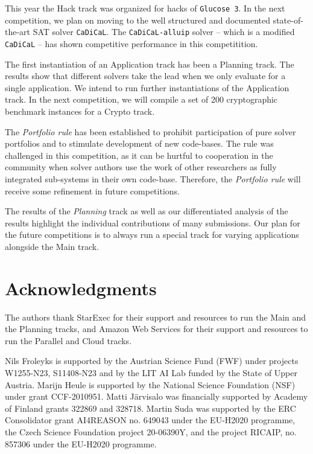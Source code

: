 \documentclass{elsarticle}
\newcommand{\solver}[1]{\texttt{#1}}
\begin{document}
This year the Hack track was organized for hacks of \solver{Glucose 3}. 
In the next competition, we plan on moving to the well structured and documented state-of-the-art SAT solver \solver{CaDiCaL}. 
The \solver{CaDiCaL-alluip} solver -- which is a modified \solver{CaDiCaL} -- has shown competitive performance in this competitition. 

The first instantiation of an Application track has been a Planning track. 
The results show that different solvers take the lead when we only evaluate for a single application. 
We intend to run further instantiations of the Application track. 
In the next competition, we will compile a set of 200 cryptographic benchmark instances for a Crypto track. 

The \emph{Portfolio rule} has been established to prohibit participation of pure solver portfolios and to stimulate development of new code-bases. 
The rule was challenged in this competition, as it can be hurtful to cooperation in the community when solver authors use the work of other researchers as fully integrated sub-systems in their own code-base. 
Therefore, the \emph{Portfolio rule} will receive some refinement in future competitions. 

The results of the \emph{Planning} track as well as our differentiated analysis of the results highlight the individual contributions of many submissions. 
Our plan for the future competitions is to always run a special track for varying applications alongside the Main track. 


\section*{Acknowledgments}
The authors thank StarExec for their support and resources to run the Main and the Planning tracks, and Amazon Web Services 
for their support and resources to run the Parallel and Cloud tracks. 

Nils Froleyks is supported by the Austrian Science Fund (FWF) under projects
W1255-N23, S11408-N23 and by the LIT AI Lab funded by the State of Upper
Austria.
%
Marijn Heule is supported by the National Science Foundation (NSF) under grant CCF-2010951. 
%
Matti J\"arvisalo was financially supported by Academy of Finland grants 322869 and 328718.
%
Martin Suda was supported by the ERC Consolidator grant AI4REASON no. 649043 under the EU-H2020 programme,
the Czech Science Foundation project 20-06390Y, and the project RICAIP, no. 857306 under the EU-H2020 programme.





\end{document}
